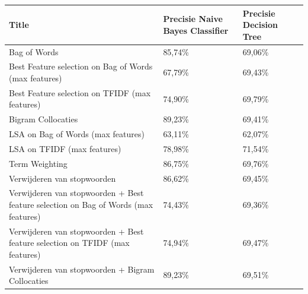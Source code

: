 \begin{table}[h]
\centering
\begin{adjustbox}{width=1\textwidth}
\begin{tabular}{|l|l|l|}
\hline
{\bf Title}                                                                         & {\bf Precisie Naive Bayes Classifier} & {\bf Precisie Decision Tree} \\ \hline
Bag of Words                                                                        & 85,74\%                               & 69,06\%                      \\ \hline
Best Feature selection on Bag of Words (max features)                               & 67,79\%                               & 69,43\%                      \\ \hline
Best Feature selection on TFIDF (max features)                                      & 74,90\%                               & 69,79\%                      \\ \hline
Bigram Collocaties                                                                  & 89,23\%                               & 69,41\%                      \\ \hline
LSA on Bag of Words (max features)                                                  & 63,11\%                               & 62,07\%                      \\ \hline
LSA on TFIDF (max features)                                                         & 78,98\%                               & 71,54\%                      \\ \hline
Term Weighting                                                                      & 86,75\%                               & 69,76\%                      \\ \hline
Verwijderen van stopwoorden                                                         & 86,62\%                               & 69,45\%                      \\ \hline
Verwijderen van stopwoorden + Best feature selection on Bag of Words (max features) & 74,43\%                               & 69,36\%                      \\ \hline
Verwijderen van stopwoorden + Best feature selection on TFIDF (max features)        & 74,94\%                               & 69,47\%                      \\ \hline
Verwijderen van stopwoorden + Bigram Collocaties                                    & 89,23\%                               & 69,51\%                      \\ \hline

\end{tabular}
\end{adjustbox}
\end{table}
